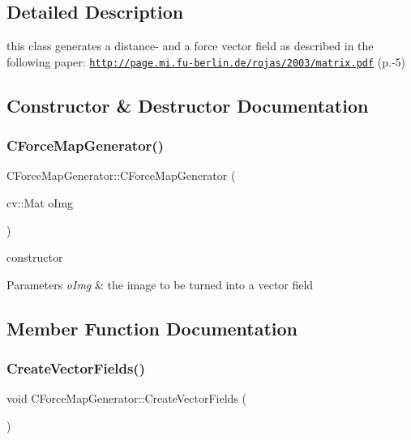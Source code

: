 \subsection{Detailed Description}
this class generates a distance-\/ and a force vector field as described in the following paper\+: \href{http://page.mi.fu-berlin.de/rojas/2003/matrix.pdf}{\tt http\+://page.\+mi.\+fu-\/berlin.\+de/rojas/2003/matrix.\+pdf} (p.-\/5) 

\subsection{Constructor \& Destructor Documentation}
\mbox{\label{classCForceMapGenerator_a9ac30f44691e71c6ce65f4eabbb03801}} 
\subsubsection{\texorpdfstring{C\+Force\+Map\+Generator()}{CForceMapGenerator()}}
{\footnotesize\ttfamily C\+Force\+Map\+Generator\+::\+C\+Force\+Map\+Generator (\begin{DoxyParamCaption}\item[{cv\+::\+Mat}]{o\+Img }\end{DoxyParamCaption})\hspace{0.3cm}{\ttfamily [inline]}}

constructor 
\begin{DoxyParams}{Parameters}
{\em o\+Img} & the image to be turned into a vector field \\
\hline
\end{DoxyParams}


\subsection{Member Function Documentation}
\mbox{\label{classCForceMapGenerator_a8c3c6ab352e4ddb604dd33befc9b9147}} 
\subsubsection{\texorpdfstring{Create\+Vector\+Fields()}{CreateVectorFields()}}
{\footnotesize\ttfamily void C\+Force\+Map\+Generator\+::\+Create\+Vector\+Fields (\begin{DoxyParamCaption}{ }\end{DoxyParamCaption})\hspace{0.3cm}{\ttfamily [inline]}}

